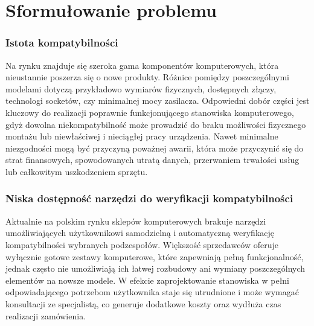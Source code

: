 \documentclass[a4paper,twoside,12pt]{book}
\newcommand{\obcy}[1]{\emph{#1}}
\newcommand{\english}[1]{{\selectlanguage{british}\obcy{#1}}}
\begin{document}



\section{Sformułowanie problemu}

\subsubsection{Istota kompatybilności}
Na rynku znajduje się szeroka gama komponentów komputerowych, która nieustannie poszerza się o nowe produkty. Różnice pomiędzy poszczególnymi modelami dotyczą przykładowo wymiarów fizycznych, dostępnych złączy, technologi socketów, czy minimalnej mocy zasilacza. Odpowiedni dobór części jest kluczowy do realizacji poprawnie funkcjonującego stanowiska komputerowego, gdyż dowolna niekompatybilność może prowadzić do braku możliwości fizycznego montażu lub niewłaściwej i nieciągłej pracy urządzenia. Nawet minimalne niezgodności mogą być przyczyną poważnej awarii, która może przyczynić się do strat finansowych, spowodowanych utratą danych, przerwaniem trwałości usług lub całkowitym uszkodzeniem sprzętu.

\subsubsection{Niska dostępność narzędzi do weryfikacji kompatybilności}

Aktualnie na polskim rynku sklepów komputerowych brakuje narzędzi umożliwiających użytkownikowi samodzielną i automatyczną weryfikację kompatybilności wybranych podzespołów. Większość sprzedawców oferuje wyłącznie gotowe zestawy komputerowe, które zapewniają pełną funkcjonalność, jednak często nie umożliwiają ich łatwej rozbudowy ani wymiany poszczególnych elementów na nowsze modele. W efekcie zaprojektowanie stanowiska w pełni odpowiadającego potrzebom użytkownika staje się utrudnione i może wymagać konsultacji ze specjalistą, co generuje dodatkowe koszty oraz wydłuża czas realizacji zamówienia.
\end{document}

